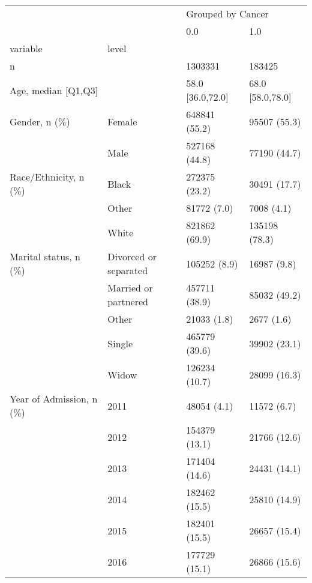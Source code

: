 \begin{tabular}{llll}
\toprule
                                       &   & \multicolumn{2}{l}{Grouped by Cancer} \\
                                       &   &                0.0 &                1.0 \\
variable & level &                    &                    \\
\midrule
n &   &            1303331 &             183425 \\
Age, median [Q1,Q3] &   &   58.0 [36.0,72.0] &   68.0 [58.0,78.0] \\
Gender, n (\%) & Female &      648841 (55.2) &       95507 (55.3) \\
                                       & Male &      527168 (44.8) &       77190 (44.7) \\
Race/Ethnicity, n (\%) & Black &      272375 (23.2) &       30491 (17.7) \\
                                       & Other &        81772 (7.0) &         7008 (4.1) \\
                                       & White &      821862 (69.9) &      135198 (78.3) \\
Marital status, n (\%) & Divorced or separated &       105252 (8.9) &        16987 (9.8) \\
                                       & Married or partnered &      457711 (38.9) &       85032 (49.2) \\
                                       & Other &        21033 (1.8) &         2677 (1.6) \\
                                       & Single &      465779 (39.6) &       39902 (23.1) \\
                                       & Widow &      126234 (10.7) &       28099 (16.3) \\
Year of Admission, n (\%) & 2011 &        48054 (4.1) &        11572 (6.7) \\
                                       & 2012 &      154379 (13.1) &       21766 (12.6) \\
                                       & 2013 &      171404 (14.6) &       24431 (14.1) \\
                                       & 2014 &      182462 (15.5) &       25810 (14.9) \\
                                       & 2015 &      182401 (15.5) &       26657 (15.4) \\
                                       & 2016 &      177729 (15.1) &       26866 (15.6) \\

\end{tabular}
